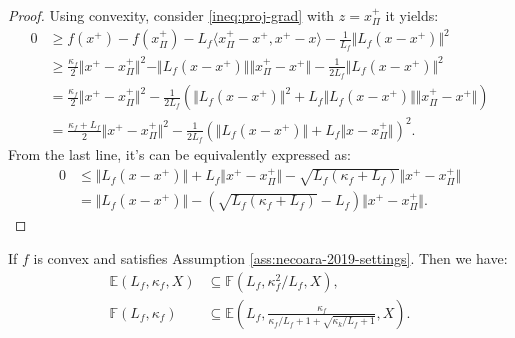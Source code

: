 \documentclass[12pt]{report}
\begin{document}
            \begin{proof}
                Using convexity, consider \eqref{ineq:proj-grad} with $z = x^+_\Pi$ it yields: 
                {\small
                \begin{align*}
                    0 &\ge 
                    f(x^+) - f(x^+_\Pi) - L_f\langle x_\Pi^+ - x^+, x^+ - x\rangle
                    - \frac{1}{L_f}\Vert L_f(x - x^+)\Vert^2
                    \\
                    &\ge
                    \frac{\kappa_f}{2}\Vert x^+ - x_\Pi^+\Vert^2
                    - \Vert L_f(x - x^+)\Vert\Vert x^+_\Pi - x^+\Vert
                    - \frac{1}{2L_f}\Vert L_f(x - x^+)\Vert^2 
                    \\
                    &= \frac{\kappa_f}{2}\Vert x^+ - x_\Pi^+\Vert^2
                    - \frac{1}{2L_f}\left(
                        \Vert L_f(x - x^+)\Vert^2
                        + L_f\Vert L_f(x - x^+)\Vert\Vert x_\Pi^+ - x^+\Vert
                    \right)
                    \\
                    &= 
                    \frac{\kappa_f + L_f}{2}\Vert x^+ - x^+_\Pi\Vert^2
                    - \frac{1}{2L_f}\left(
                        \Vert L_f(x - x^+)\Vert + L_f\Vert x - x_\Pi^+\Vert
                    \right)^2.
                \end{align*}
                }
                From the last line, it's can be equivalently expressed as:
                \begin{align*}
                    0 &\le
                    \Vert L_f(x - x^+)\Vert + L_f\Vert x^+ - x_\Pi^+\Vert
                    - \sqrt{L_f(\kappa_f + L_f)}\Vert x^+ - x^+_\Pi\Vert
                    \\
                    &=
                    \Vert L_f(x - x^+)\Vert
                    - \left(\sqrt{L_f(\kappa_f + L_f)} - L_f\right)\Vert x^+ - x^+_\Pi\Vert.
                \end{align*}
            \end{proof}
            \begin{theorem}\label{thm:qfg-peb-equiv}
                If $f$ is convex and satisfies Assumption \ref{ass:necoara-2019-settings}. 
                Then we have: 
                \begin{align*}
                    \mathbb E(L_f, \kappa_f, X) &\subseteq \mathbb F(L_f, \kappa^2_f/L_f, X), 
                    \\
                    \mathbb F(L_f, \kappa_f) 
                    &\subseteq 
                    \mathbb E\left(
                        L_f,
                        \frac{\kappa_f}{\kappa_f/L_f + 1 + \sqrt{\kappa_k/L_f + 1}}, 
                        X
                    \right). 
                \end{align*}
            \end{theorem}
\end{document}
